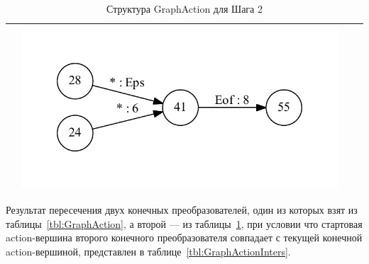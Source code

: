 \begin{table}[h]
\begin{tabular}{ | c | c | c | c | }
\begin{minipage}{.22\textwidth}
    \end{minipage}
    & 
    \begin{minipage}{.22\textwidth}
      \includegraphics[width=\linewidth]{Polubelova/55_inv}
    \end{minipage}    
    \\ \hline
  \end{tabular}
  \caption{Структура GraphAction для Шага 2}
  \label{tbl:GraphActionInv}
\end{table}

Результат пересечения двух конечных преобразователей, один из которых взят из таблицы~\ref{tbl:GraphAction}, а второй --- из таблицы~\ref{tbl:GraphActionInv}, при условии что стартовая action-вершина второго конечного преобразователя совпадает с текущей конечной action-вершиной, представлен в таблице~\ref{tbl:GraphActionInters}.

